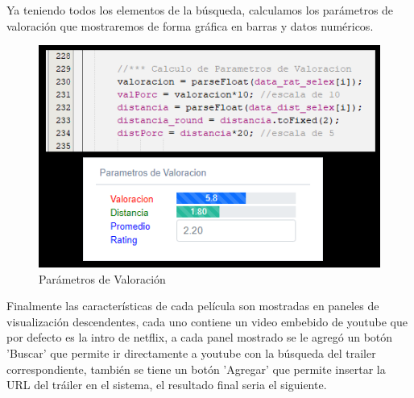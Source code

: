 \documentclass{article}
\begin{document}
    	

        Ya teniendo todos los elementos de la búsqueda, calculamos los parámetros de valoración que mostraremos de forma gráfica en barras y datos numéricos.
    
        \begin{figure}[H]
    			\centering
    			\includegraphics[scale=0.80]{img/vista_netflix_02.png}
    			\caption{Parámetros de Valoración}
    			\label{fig:netflix2}
    		\end{figure}
    		
        Finalmente las características de cada película son mostradas en paneles de visualización descendentes, cada uno contiene un video embebido de youtube que por defecto es la intro de netflix, a cada panel mostrado se le agregó un botón 'Buscar' que permite ir directamente a youtube con la búsqueda del trailer correspondiente, también se tiene un botón 'Agregar' que permite insertar la URL del tráiler en el sistema, el resultado final seria el siguiente.
	
\end{document}
